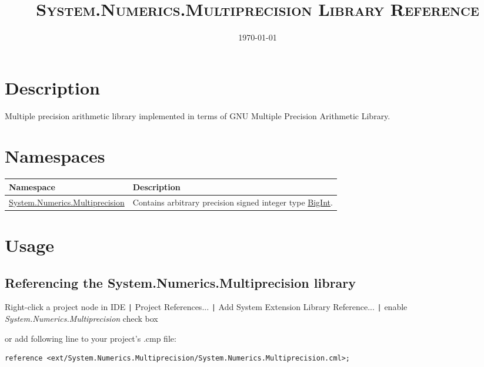 \documentclass[a4paper,oneside,11.000000pt]{book}
\begin{document}
\clearpage

\frontmatter
\title{\textsc{System.Numerics.Multiprecision Library Reference}
}
\date{\today}
\maketitle
\tableofcontents

\clearpage
\chapter{Description}
\begin{flushleft}
Multiple precision arithmetic library implemented in terms of GNU Multiple Precision Arithmetic Library.

\end{flushleft}
\chapter{Namespaces}
\begin{flushleft}
\begin{supertabular}[l]{!{\raggedright}p{7.44777cm}!{\raggedright}p{7.70223cm}}
\textbf{Namespace}
& \textbf{Description}
\\
\hline
\hyperlink{System.Numerics.Multiprecision}{System.Numerics.Multiprecision}
& Contains arbitrary precision signed integer type \hyperlink{System.Numerics.Multiprecision.BigInt}{BigInt}.

\\
\end{supertabular}

\end{flushleft}
\clearpage
\mainmatter

\chapter{Usage}

\section{Referencing the System.Numerics.Multiprecision library}

Right-click a project node in IDE \verb.|. Project References... \verb.|.
Add System Extension Library Reference... \verb.|.
enable \emph{System.Numerics.Multiprecision} check box

\begin{flushleft}
or add following line to your project's .cmp file:
\begin{verbatim}
reference <ext/System.Numerics.Multiprecision/System.Numerics.Multiprecision.cml>;
\end{verbatim}
\end{flushleft}
\end{document}
